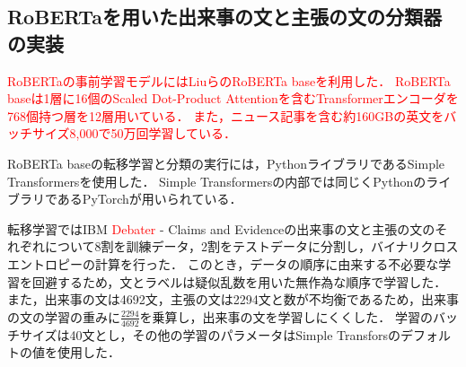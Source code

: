 \documentclass[12pt,a4j]{jreport}
\begin{document}


\subsection{RoBERTaを用いた出来事の文と主張の文の分類器の実装}
\textcolor{red}{
RoBERTaの事前学習モデルにはLiuらのRoBERTa baseを利用した\cite{liu_roberta_2019}．
RoBERTa baseは1層に16個のScaled Dot-Product Attentionを含むTransformerエンコーダを768個持つ層を12層用いている．
また，ニュース記事を含む約160GBの英文をバッチサイズ8,000で50万回学習している．
}


RoBERTa baseの転移学習と分類の実行には，PythonライブラリであるSimple Transformersを使用した．
Simple Transformersの内部では同じくPythonのライブラリであるPyTorchが用いられている．

転移学習ではIBM \textcolor{red}{Debater} - Claims and Evidenceの出来事の文と主張の文のそれぞれについて8割を訓練データ，2割をテストデータに分割し，バイナリクロスエントロピーの計算を行った．
このとき，データの順序に由来する不必要な学習を回避するため，文とラベルは疑似乱数を用いた無作為な順序で学習した\cite{aurellen20}．
また，出来事の文は4692文，主張の文は2294文と数が不均衡であるため，出来事の文の学習の重みに$\frac{2294}{4692}$を乗算し，出来事の文を学習しにくくした．
学習のバッチサイズは40文とし，その他の学習のパラメータはSimple Transforsのデフォルトの値を使用した．
\end{document}
